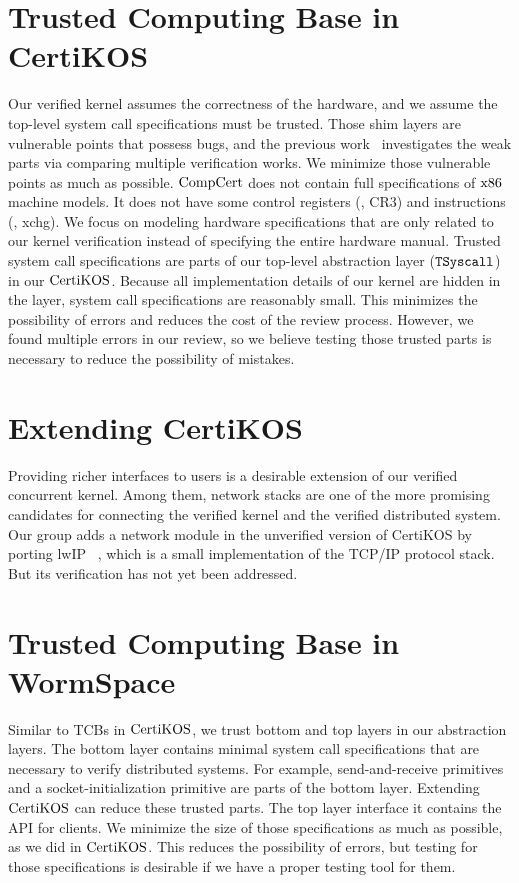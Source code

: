 \section{Trusted Computing Base in CertiKOS}

Our verified kernel assumes the correctness of the hardware, and we assume the top-level system call specifications must be trusted. 
Those shim layers are vulnerable points that possess bugs, and the previous work~\cite{shimlayer} investigates the weak parts via comparing 
multiple verification works. We minimize those vulnerable points as much as possible. 
$\mathrm{CompCert}$ does not contain full specifications of $\mathrm{x86}$ machine models.
It does not have some control registers (\eg, CR3) and 
instructions (\eg, xchg).
We focus on modeling hardware specifications that are only related to our kernel verification instead of specifying the entire hardware manual. 
Trusted system call specifications are parts of our top-level abstraction layer (${{\mathrm{\texttt{TSyscall}}}}$) in our $\mathrm{CertiKOS}$.
Because all implementation details of our kernel are hidden in the layer, system call specifications are reasonably small. 
This minimizes the possibility of errors and reduces the cost of the review process. However, we found multiple errors 
in our review, so we believe testing those trusted parts is necessary to reduce the possibility of mistakes.

\section{Extending CertiKOS}

Providing richer interfaces to users is a desirable extension of our verified concurrent kernel. Among them, network stacks are 
one of the more promising candidates for connecting the verified kernel and the verified distributed system. 
Our group adds a network module in the unverified 
version of CertiKOS by porting lwIP ~\cite{lwip},  which is a small implementation of the TCP/IP protocol stack. 
But its verification has not yet been addressed.

\section{Trusted Computing Base in WormSpace}

Similar to TCBs in $\mathrm{CertiKOS}$, we trust bottom and top layers in our abstraction layers.
 The bottom layer contains minimal system call specifications that are necessary to verify distributed systems. 
 For example, send-and-receive primitives and a socket-initialization primitive are parts of the bottom layer. 
Extending $\mathrm{CertiKOS}$ can reduce these trusted parts. 
The top layer interface it contains the API for clients. 
We minimize the size of those specifications as much as possible, as we did in   $\mathrm{CertiKOS}$.
This reduces the possibility of errors, but testing for those specifications is desirable if we have a proper testing tool for them.

